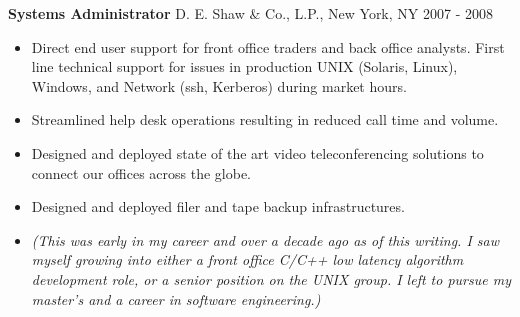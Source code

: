 \textbf{Systems Administrator}
D. E. Shaw \& Co., L.P., New York, NY \hfill 2007 - 2008
\begin{itemize}  \itemsep -2pt %
\item Direct end user support for front office traders and back office
      analysts. First line technical support for issues in production
      UNIX (Solaris, Linux), Windows, and Network (ssh, Kerberos) during
      market hours.
\item Streamlined help desk operations resulting in reduced call time and
      volume.
\item Designed and deployed state of the art video teleconferencing
      solutions to connect our offices across the globe.
\item Designed and deployed filer and tape backup infrastructures.
\item \textit{(This was early in my career and over a decade ago as of this
      writing. I saw myself growing into either a front office C/C++
      low latency algorithm development role, or a senior position
      on the UNIX group. I left to pursue my master's and a career
      in software engineering.)}
\end{itemize}
